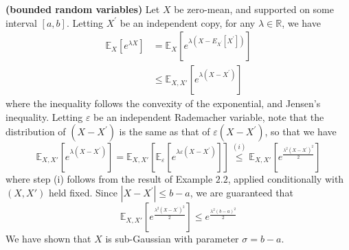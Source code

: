 \documentclass{article}
\newcommand{\bfs}[1]{\textbf{({#1})}}
\begin{document}
\begin{exma}{\bfs{bounded random variables}}
 Let $X$ be zero-mean, and supported on some interval $[a, b] .$ Letting $X^{\prime}$ be an independent copy, for any $\lambda \in \mathbb{R}$, we have
$$
\begin{aligned}
\mathbb{E}_{X}\left[e^{\lambda X}\right] &=\mathbb{E}_{X}\left[e^{\lambda\left(X-E_{X^{\prime}}\left[X^{\prime}\right]\right)}\right] \\
& \leq \mathbb{E}_{X,X'}\left[e^{\lambda\left(X-X^{\prime}\right)}\right]
\end{aligned}
$$
where the inequality follows the convexity of the exponential, and Jensen's inequality. Letting $\varepsilon$ be an independent Rademacher variable, note that the distribution of $\left(X-X^{\prime}\right)$ is the same as that of $\varepsilon\left(X-X^{\prime}\right)$, so that we have
$$
\mathbb{E}_{X,X'}\left[e^{\lambda\left(X-X^{\prime}\right)}\right]=\mathbb{E}_{X,X'}\left[\mathbb{E}_{\varepsilon}\left[e^{\lambda \varepsilon\left(X-X^{\prime}\right)}\right]\right] \stackrel{(i)} \leq \mathbb{E}_{X,X'}\left[e^{\frac{\lambda^{2}\left(X-X^{\prime}\right)^{2}}{2}}\right]
$$
where step (i) follows from the result of Example $2.2$, applied conditionally with $\left(X,X'\right)$ held fixed. Since $\left|X-X^{\prime}\right| \leq b-a$, we are guaranteed that
$$
\mathbb{E}_{X,X'}\left[e^{\frac{\lambda^{2}\left(X-X^{\prime}\right)^{2}}{2}}\right] \leq e^{\frac{\lambda^{2}(b-a)^{2}}{2}}
$$
We have shown that $X$ is sub-Gaussian with parameter $\sigma=b-a$. 
\end{exma}
\end{document}
